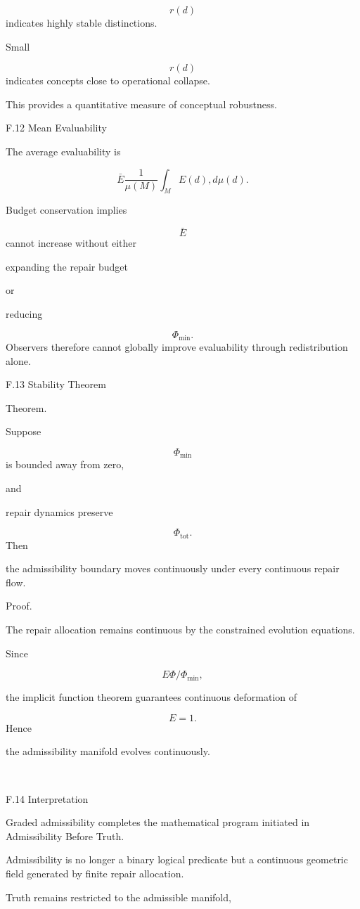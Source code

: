 \documentclass[12pt,oneside]{article}
\theoremstyle{plain}
\theoremstyle{definition}
\theoremstyle{remark}
\begin{document}
\[
r(d)
\]
indicates highly stable distinctions.

Small

\[
r(d)
\]
indicates concepts close to operational collapse.

This provides a quantitative measure of conceptual robustness.


F.12 Mean Evaluability

The average evaluability is

\[
\bar E
\frac1{\mu(M)}
\int_M
E(d)
,d\mu(d).
\]

Budget conservation implies

\[
\bar E
\]
cannot increase without either

expanding the repair budget

or

reducing

\[
\Phi_{\min}.
\]
Observers therefore cannot globally improve evaluability through redistribution alone.


F.13 Stability Theorem

Theorem.

Suppose

\[
\Phi_{\min}
\]
is bounded away from zero,

and

repair dynamics preserve

\[
\Phi_{\mathrm{tot}}.
\]
Then

the admissibility boundary moves continuously under every continuous repair flow.

Proof.

The repair allocation remains continuous by the constrained evolution equations.

Since

\[
E
\Phi/\Phi_{\min},
\]

the implicit function theorem guarantees continuous deformation of

\[
E=1.
\]
Hence

the admissibility manifold evolves continuously.

\square


F.14 Interpretation

Graded admissibility completes the mathematical program initiated in Admissibility Before Truth.

Admissibility is no longer a binary logical predicate but a continuous geometric field generated by finite repair allocation.

Truth remains restricted to the admissible manifold,
\end{document}
